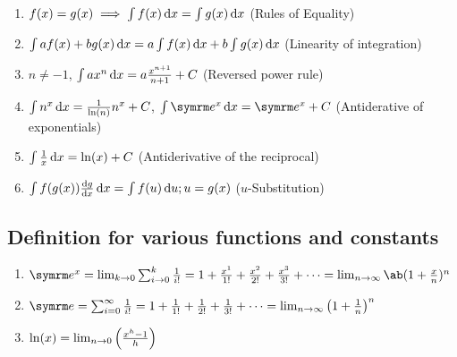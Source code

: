 \begin{enumerate}
  \item $f(x) = g(x) \implies \int f(x)\odif{x} = \int g(x)\odif{x}$ (Rules of Equality)
  \item $\int af(x) + bg(x) \odif{x} = a\int f(x)\odif{x} + b\int g(x)\odif{x}$ (Linearity of integration)
  \item $n \neq -1$, $\int ax^n\odif{x} = a\frac{x^{n + 1}}{n + 1} + C$ (Reversed power rule)
  \item $\int n^x\odif{x} = \frac{1}{\ln(n)}n^x + C$, $\int \e^x\odif{x} = \e^x + C$ (Antiderative of exponentials)
  \item $\int \frac{1}{x}\odif{x} = \ln(x) + C$ (Antiderivative of the reciprocal)
  \item $\int f(g(x))\odv{g}{x}\odif{x} = \int f(u)\odif{u}; u = g(x)$ ($u$-Substitution)
\end{enumerate}

\subsection{Definition for various functions and constants}

\begin{enumerate}
  \item $\e^x = \lim_{k \appr 0}\sum_{i \appr 0}^{k}\frac{1}{i!} = 1 + \frac{x^1}{1!} + \frac{x^2}{2!} + \frac{x^3}{3!} + \dots = \lim_{n \appr \infty}\ab(1 + \frac{x}{n})^n$
  \item $\e = \sum_{i = 0}^{\infty}\frac{1}{i!} = 1 + \frac{1}{1!} + \frac{1}{2!} + \frac{1}{3!} + \dots = \lim_{n \appr \infty}\left(1 + \frac{1}{n}\right)^n$
  \item $\ln(x) = \lim_{n \rightarrow 0}\left(\frac{x^h - 1}{h}\right)$
\end{enumerate}

\everymath{\textstyle}
